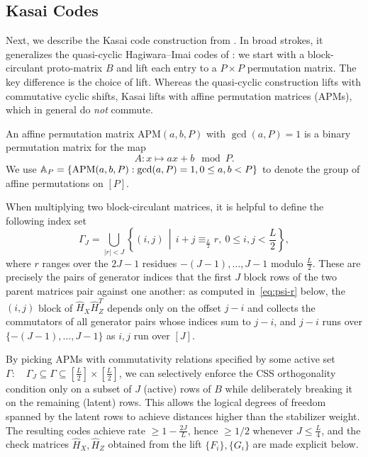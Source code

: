 \subsection{Kasai Codes}\label{ssec:kasai}
Next, we describe the Kasai code construction from
\cite{kasai2026breakingorthogonalitybarrierquantum}. In broad strokes, it generalizes the quasi-cyclic Hagiwara--Imai codes of \cite{Hagiwara_2007}: we start with a
block-circulant proto-matrix $B$ and lift each entry to a $P \times P$ permutation matrix. The key difference is the choice of lift. Whereas the quasi-cyclic construction lifts with commutative cyclic shifts, Kasai lifts with affine permutation matrices (APMs), which in general do \emph{not} commute.

\begin{definition}
An affine permutation matrix $\mathrm{APM}(a, b, P)$ with $\gcd(a, P) = 1$ is a binary permutation matrix for the map
\[
A: x \mapsto ax + b \mod P.
\]
We use $\mathbb A_P = \{\mathrm{APM}(a,b,P):\gcd(a,P) = 1, 0\leq a,b<P\}$ to denote the group of affine permutations on $[P]$.
\end{definition}

When multiplying two block-circulant matrices, it is helpful to define the following index set
\begin{equation}\label{eq:activeset}
    \Gamma_J= \bigcup_{|r|< J} \left\{(i,j)\, \middle|\, i+j \equiv_{\frac L2} r,\ 0\leq i,j< \frac L2\right\},
\end{equation}
where $r$ ranges over the $2J-1$ residues $-(J-1),\dots, J-1$ modulo $\frac L2$. These are precisely the pairs of generator indices that the first $J$ block rows of the two parent matrices pair against one another: as computed in~\eqref{eq:psi-r} below, the $(i,j)$ block of $\hat H_X\hat H_Z^T$ depends only on the offset $j-i$ and collects the commutators of all generator pairs whose indices sum to $j - i$, and $j-i$ runs over $\{-(J-1),\dots,J-1\}$ as $i,j$ run over $[J]$.

By picking APMs with commutativity relations specified by some active set $\Gamma:\quad \Gamma_{J}\subseteq \Gamma \subseteq [\frac L2]\times [\frac L2]$, we can selectively enforce the CSS orthogonality condition only on a subset of $J$ (active) rows of $B$ while deliberately breaking it on the remaining (latent) rows. This allows the logical degrees of freedom spanned by the latent rows to achieve distances higher than the stabilizer weight. The resulting codes achieve rate $\geq 1-\frac{2J}{L}$, hence $\geq 1/2$ whenever $J\leq \frac L4$, and the check matrices $\hat H_X, \hat H_Z$ obtained from the lift $\{F_i\}, \{G_i\}$ are made explicit below.

